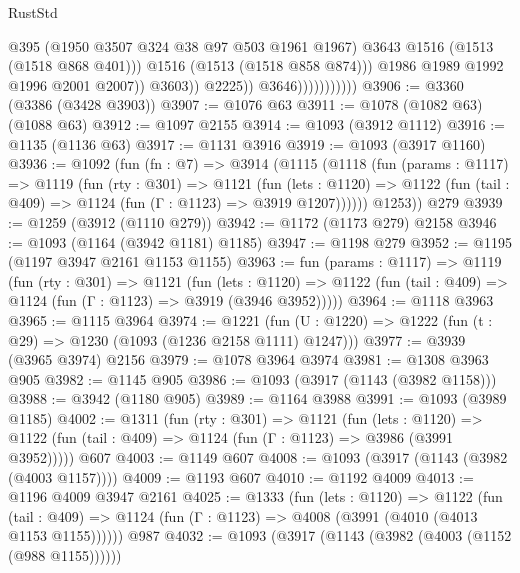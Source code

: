 \begin{lexlean}{RustStd}
\begin{coremodule}
                                          @395
                                          (@1950 @3507 @324 @38 @97 @503 @1961 @1967)
                                          @3643
                                          @1516
                                          (@1513 (@1518 @868 @401)))
                                        @1516
                                        (@1513 (@1518 @858 @874)))
                                      @1986
                                      @1989
                                      @1992
                                      @1996
                                      @2001
                                      @2007))
                                  @3603))
                              @2225))
                          @3646)))))))))))
@3906 := @3360 (@3386 (@3428 @3903))
@3907 := @1076 @63
@3911 := @1078 (@1082 @63) (@1088 @63)
@3912 := @1097 @2155
@3914 := @1093 (@3912 @1112)
@3916 := @1135 (@1136 @63)
@3917 := @1131 @3916
@3919 := @1093 (@3917 @1160)
@3936 := @1092
    (fun (fn : @7) =>
    @3914
      (@1115
        (@1118
          (fun (params : @1117) =>
          @1119
            (fun (rty : @301) =>
            @1121
              (fun (lets : @1120) =>
              @1122 (fun (tail : @409) => @1124 (fun (Γ : @1123) => @3919 @1207))))))
        @1253))
    @279
@3939 := @1259 (@3912 (@1110 @279))
@3942 := @1172 (@1173 @279) @2158
@3946 := @1093 (@1164 (@3942 @1181) @1185)
@3947 := @1198 @279
@3952 := @1195 (@1197 @3947 @2161 @1153 @1155)
@3963 := fun (params : @1117) =>
  @1119
    (fun (rty : @301) =>
    @1121
      (fun (lets : @1120) =>
      @1122 (fun (tail : @409) => @1124 (fun (Γ : @1123) => @3919 (@3946 @3952)))))
@3964 := @1118 @3963
@3965 := @1115 @3964
@3974 := @1221 (fun (U : @1220) => @1222 (fun (t : @29) => @1230 (@1093 (@1236 @2158 @1111) @1247)))
@3977 := @3939 (@3965 @3974) @2156
@3979 := @1078 @3964 @3974
@3981 := @1308 @3963 @905
@3982 := @1145 @905
@3986 := @1093 (@3917 (@1143 (@3982 @1158)))
@3988 := @3942 (@1180 @905)
@3989 := @1164 @3988
@3991 := @1093 (@3989 @1185)
@4002 := @1311
    (fun (rty : @301) =>
    @1121
      (fun (lets : @1120) =>
      @1122 (fun (tail : @409) => @1124 (fun (Γ : @1123) => @3986 (@3991 @3952)))))
    @607
@4003 := @1149 @607
@4008 := @1093 (@3917 (@1143 (@3982 (@4003 @1157))))
@4009 := @1193 @607
@4010 := @1192 @4009
@4013 := @1196 @4009 @3947 @2161
@4025 := @1333
    (fun (lets : @1120) =>
    @1122
      (fun (tail : @409) => @1124 (fun (Γ : @1123) => @4008 (@3991 (@4010 (@4013 @1153 @1155))))))
    @987
@4032 := @1093 (@3917 (@1143 (@3982 (@4003 (@1152 (@988 @1155))))))

\end{coremodule}
\end{lexlean}
